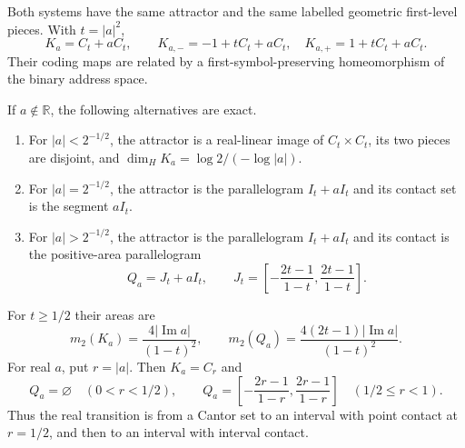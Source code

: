 \begin{theorem}
\label{thm:restored-OO}
Both systems have the same attractor and the same labelled geometric
first-level pieces. With $t=|a|^2$,
\begin{equation}\label{eq:restored-OO-set}
 K_a=C_t+aC_t,\qquad
 K_{a,-}=-1+tC_t+aC_t,\quad
 K_{a,+}=1+tC_t+aC_t.
\end{equation}
Their coding maps are related by a first-symbol-preserving
homeomorphism of the binary address space.

If $a\notin\mathbb R$, the following alternatives are exact.
\begin{enumerate}
\item For $|a|<2^{-1/2}$, the attractor is a real-linear image of
      $C_t\times C_t$, its two pieces are disjoint, and
      $\dim_H K_a=\log2/(-\log|a|)$.
\item For $|a|=2^{-1/2}$, the attractor is the parallelogram
      $I_t+aI_t$ and its contact set is the segment $aI_t$.
\item For $|a|>2^{-1/2}$, the attractor is the parallelogram
      $I_t+aI_t$ and its contact is the positive-area parallelogram
      \begin{equation}\label{eq:restored-OO-Q}
      Q_a=J_t+aI_t,\qquad
      J_t=\left[-\frac{2t-1}{1-t},\frac{2t-1}{1-t}\right].
      \end{equation}
\end{enumerate}
For $t\ge1/2$ their areas are
\begin{equation}\label{eq:restored-OO-areas}
 m_2(K_a)=\frac{4|\operatorname{Im}a|}{(1-t)^2},\qquad
 m_2(Q_a)=\frac{4(2t-1)|\operatorname{Im}a|}{(1-t)^2}.
\end{equation}
For real $a$, put $r=|a|$. Then $K_a=C_r$ and
\[
 Q_a=\varnothing\quad(0<r<1/2),\qquad
 Q_a=\left[-\frac{2r-1}{1-r},\frac{2r-1}{1-r}\right]
           \quad(1/2\le r<1).
\]
Thus the real transition is from a Cantor set to an interval with
point contact at $r=1/2$, and then to an interval with interval contact.
\end{theorem}

